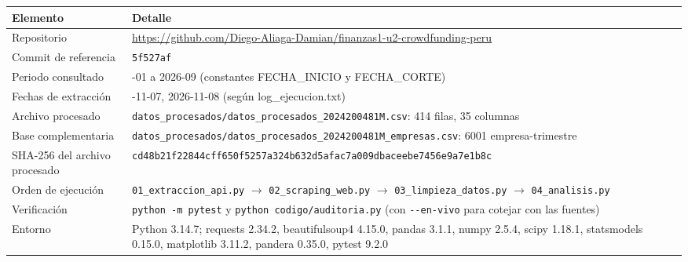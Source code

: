 \begin{longtable}{@{}>{\RaggedRight\arraybackslash}p{3.8cm}>{\RaggedRight\arraybackslash}p{11.3cm}@{}}
\toprule
Elemento & Detalle \\
\midrule
\endhead
Repositorio & \url{https://github.com/Diego-Aliaga-Damian/finanzas1-u2-crowdfunding-peru} \\
Commit de referencia & \texttt{5f527af} \\
Periodo consultado & 2021-01 a 2026-09 (constantes FECHA\_INICIO y FECHA\_CORTE) \\
Fechas de extracción & 2026-11-07, 2026-11-08 (según log\_ejecucion.txt) \\
Archivo procesado & \texttt{datos\_procesados/datos\_procesados\_2024200481M.csv}: 414 filas, 35 columnas \\
Base complementaria & \texttt{datos\_procesados/datos\_\allowbreak{}procesados\_\allowbreak{}2024200481M\_\allowbreak{}empresas.csv}: 6001 empresa-trimestre \\
SHA-256 del archivo procesado & \texttt{cd48b21f22844cff650f5257a324b632}\newline\texttt{d5afac7a009dbaceebe7456e9a7e1b8c} \\
Orden de ejecución & \texttt{01\_extraccion\_api.py} $\rightarrow$ \texttt{02\_scraping\_web.py} $\rightarrow$ \texttt{03\_limpieza\_datos.py} $\rightarrow$ \texttt{04\_analisis.py} \\
Verificación & \texttt{python -m pytest} y \texttt{python codigo/auditoria.py} (con \texttt{-{}-en-vivo} para cotejar con las fuentes) \\
Entorno & Python 3.14.7; requests 2.34.2, beautifulsoup4 4.15.0, pandas 3.1.1, numpy 2.5.4, scipy 1.18.1, statsmodels 0.15.0, matplotlib 3.11.2, pandera 0.35.0, pytest 9.2.0 \\
\bottomrule
\end{longtable}
